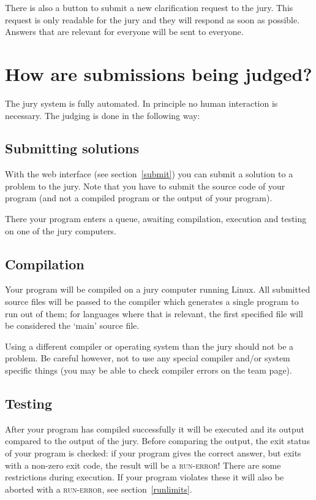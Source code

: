 There is also a button to submit a new clarification request to the
jury. This request is only readable for the jury and they will respond
as soon as possible. Answers that are relevant for everyone will be
sent to everyone.

\section{How are submissions being judged?}\label{howjudged}

The \DOMjudge jury system is fully automated. In principle no human
interaction is necessary. The judging is done in the following way:

\subsection{Submitting solutions}

With%
the web interface (see section~\ref{submit}) you can submit a solution
to a problem to the jury. Note that you have to submit the source code
of your program (and not a compiled program or the output of your
program).

There your program enters a queue, awaiting compilation, execution
and testing on one of the jury computers.

\subsection{Compilation}

Your program will be compiled on a jury computer running Linux.
All submitted source files will be passed to the compiler which
generates a single program to run out of them; for languages where
that is relevant, the first specified file will be considered the
`main' source file.

Using a different compiler or operating system than the jury should
not be a problem. Be careful however, not to use any special compiler
and/or system specific things (you may be able to check compiler errors
on the team page).

\subsection{Testing}

After your program has compiled successfully it will be executed and
its output compared to the output of the jury. Before comparing the
output, the exit status of your program is checked: if your program
gives the correct answer, but exits with a non-zero exit code, the
result will be a \textsc{run-error}! There are some restrictions during
execution. If your program violates these it will also be aborted
with a \textsc{run-error}, see section~\ref{runlimits}.

